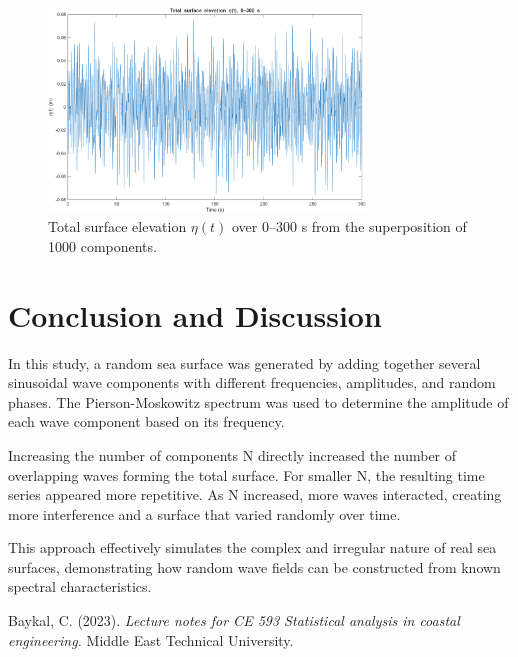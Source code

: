 \documentclass[a4paper, 11pt]{article}
\begin{document}
\begin{figure}[H]
\centering
\includegraphics[width=0.75\textwidth]{n1000.png}
\caption{Total surface elevation $\eta(t)$ over 0–300 s from the superposition of 1000 components.}
\label{fig:n1000}
\end{figure}

\section{Conclusion and Discussion}

\hspace{0.5cm}In this study, a random sea surface was generated by adding together several sinusoidal wave components with different frequencies, amplitudes, and random phases. The Pierson-Moskowitz spectrum was used to determine the amplitude of each wave component based on its frequency. 

Increasing the number of components N directly increased the number of overlapping waves forming the total surface. For smaller N, the resulting time series appeared more repetitive. As N increased, more waves interacted, creating more interference and a surface that varied randomly over time.

This approach effectively simulates the complex and irregular nature of real sea surfaces, demonstrating how random wave fields can be constructed from known spectral characteristics. 
\newpage

\begin{thebibliography}{99}

Baykal, C. (2023). \textit{Lecture notes for CE 593 Statistical analysis in coastal engineering.} Middle East Technical University.

\end{thebibliography}
\newpage

\appendix
\end{document}
